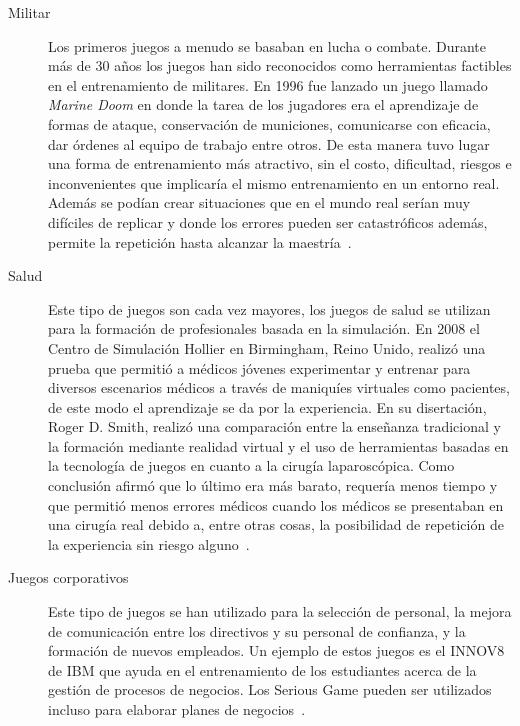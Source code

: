 \begin{description}

\item[Militar] Los primeros juegos a menudo se basaban en lucha o combate.
	Durante más de 30 años los juegos han sido reconocidos como herramientas
	factibles en el entrenamiento de militares. En 1996 fue lanzado un juego
	llamado \emph{Marine Doom} en donde la tarea de los jugadores era el
	aprendizaje de formas de ataque, conservación de municiones, comunicarse
	con eficacia, dar órdenes al equipo de trabajo entre otros. De esta
	manera tuvo lugar una forma de entrenamiento más atractivo, sin el
	costo, dificultad, riesgos e inconvenientes que implicaría el mismo
	entrenamiento en un entorno real. Además se podían crear situaciones que
	en el mundo real serían muy difíciles de replicar y donde los errores pueden
	ser catastróficos además, permite la repetición hasta alcanzar la maestría~\cite{education:games}.


\item[Salud] Este tipo de juegos son cada vez mayores, los juegos de salud se
	utilizan para la formación de profesionales basada en la simulación. En
	2008 el Centro de Simulación Hollier en Birmingham, Reino Unido, realizó
	una prueba que permitió a médicos jóvenes experimentar y entrenar para
	diversos escenarios médicos a través de maniquíes virtuales como
	pacientes, de este modo el aprendizaje se da por la experiencia. En su
	disertación, Roger D. Smith, realizó una comparación entre la enseñanza
	tradicional y la formación mediante realidad virtual y el uso de
	herramientas basadas en la tecnología de juegos en cuanto a la cirugía
	laparoscópica. Como conclusión afirmó que lo último era más barato,
	requería menos tiempo y que permitió menos errores médicos cuando los
	médicos se presentaban en una cirugía real debido a, entre otras cosas,
	la posibilidad de repetición de la experiencia sin riesgo
	alguno~\cite{education:games}.



\item[Juegos corporativos] Este tipo de juegos se han utilizado para la
	selección de personal, la mejora de comunicación entre los directivos y
	su personal de confianza, y la formación de nuevos empleados. Un ejemplo
	de estos juegos es el INNOV8 de IBM que ayuda en el entrenamiento de los
	estudiantes acerca de la gestión de procesos de negocios. Los Serious
	Game pueden ser utilizados incluso para elaborar planes de
	negocios~\cite{education:games}. 

\end{description}

